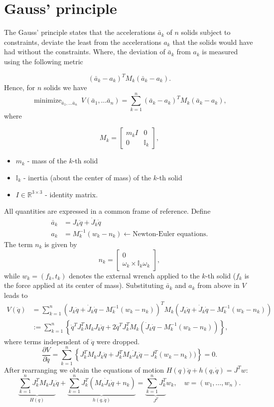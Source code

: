 \documentclass[12pt,a4paper]{article}
\newcommand{\minimize}[1]{\mathop{\mbox{minimize}}_{#1} \ }
\begin{document}
\section*{Gauss' principle}

The Gauss' principle states that the accelerations $\bar{a}_k$ of $n$ solids subject to
constraints, deviate the least from the accelerations $a_k$ that the solids would have
had without the constraints. Where, the deviation of $\bar{a}_k$ from $a_k$ is measured
using the following metric

\[
(\bar{a}_k-a_k)^TM_k(\bar{a}_k - a_k).
\]
Hence, for $n$ solids we have
\[
\minimize{\bar{a}_1,\dots\bar{a}_n}
V(\bar{a}_1,\dots\bar{a}_n) = \sum_{k=1}^{n}(\bar{a}_k-a_k)^TM_k(\bar{a}_k - a_k),
\]
where

\[
M_k = \begin{bmatrix}m_kI & 0\\ 0 & \mathbb{I}_k\end{bmatrix},
\]

\begin{itemize}
\item $m_k$ - mass of the $k$-th solid
\item $\mathbb{I}_k$ - inertia (about the center of mass) of the $k$-th solid
\item $I \in \mathbb{R}^{3 \times 3}$ - identity matrix.
\end{itemize}
All quantities are expressed in a common frame of reference. Define
\begin{align}
\bar{a}_k &= J_k\ddot{q} + \dot{J}_k\dot{q} \nonumber \\
a_k &= M_k^{-1}(w_k - n_k) \leftarrow \mbox{Newton-Euler equations}. \nonumber
\end{align}
The term $n_k$ is given by
\[
n_k = \begin{bmatrix} 0 \\ \omega_k\times\mathbb{I}_k\omega_k \end{bmatrix},
\]
while $w_k = (f_k,t_k)$ denotes the external wrench applied to the
$k$-th solid ($f_k$ is the force applied at its center of mass).
Substituting $\bar{a}_k$ and $a_k$ from above in $V$ leads to
\begin{align}
V(\ddot{q}) &= \sum_{k=1}^{n}(J_k\ddot{q} + \dot{J}_k\dot{q}-M_k^{-1}(w_k - n_k))^TM_k
%
(J_k\ddot{q} + \dot{J}_k\dot{q}-M_k^{-1}(w_k - n_k)) \nonumber \\ &:=
\sum_{k=1}^{n}\left\{\ddot{q}^TJ_k^{T}M_kJ_k\ddot{q} + 2\ddot{q}^TJ_k^{T}M_k
(\dot{J}_k\dot{q} - M_k^{-1}(w_k - n_k))\right\}, \nonumber
\end{align}
where terms independent of $\ddot{q}$ were dropped.
\[
\frac{\partial V}{\partial \ddot{q}} = \sum_{k=1}^{n}\left\{J_k^{T}M_kJ_k\ddot{q} +
J_k^{T}M_k\dot{J}_k\dot{q} - J_k^{T}(w_k - n_k))\right\} = 0.
\]
After rearranging we obtain the equations of motion $H(q)\ddot{q} + h(q, \dot{q}) =
J^Tw$:
\[
\underbrace{\sum_{k=1}^{n}J_k^{T}M_kJ_k}_{H(q)}\ddot{q} +
\underbrace{\sum_{k=1}^{n}J_k^{T}(M_k\dot{J}_k\dot{q} +n_k)}_{h(q, \dot{q})} =
\underbrace{\sum_{k=1}^{n}J_k^{T}}_{J^T}w_k, \quad w = (w_1, \dots, w_n).
\]
\end{document}
